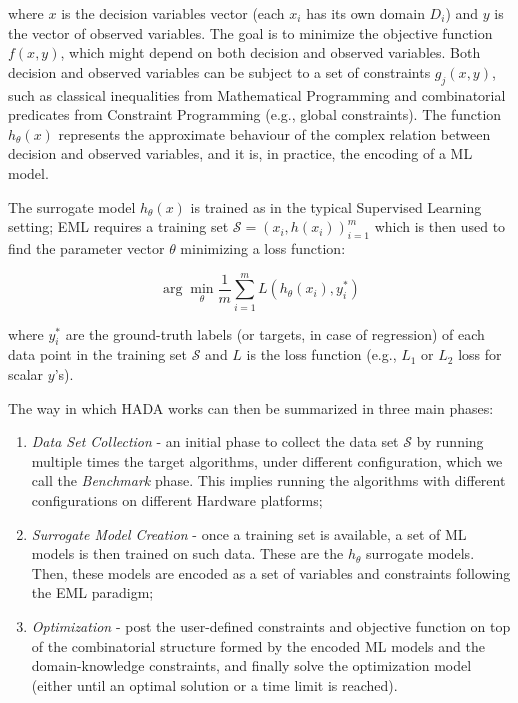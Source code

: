 \documentclass[a4paper,singleside,12pt]{report} %
\begin{document}
where $x$ is the decision variables vector (each $x_i$ has its own domain $D_i$) and $y$ is the vector of observed variables.
The goal is to minimize the objective function $f(x,y)$, which might depend on both decision and observed variables. Both 
decision and observed variables can be subject to a set of constraints $g_j(x,y)$, such as classical inequalities from 
Mathematical Programming and combinatorial predicates from Constraint Programming (e.g., global constraints). The function 
$h_{\theta}(x)$ represents the approximate behaviour of the complex relation between decision and observed variables, and it 
is, in practice, the encoding of a ML model.

The surrogate model $h_{\theta}(x)$ is trained as in the typical Supervised Learning setting; EML requires a training set 
$\mathcal{S} = (x_i, h(x_i))_{i=1}^{m}$ which is then used to find the parameter vector $\theta$ minimizing a loss function:

\begin{equation}
    \arg\min_{\theta} \frac{1}{m} \sum_{i=1}^{m} L(h_{\theta}(x_i), y_i^*)
\end{equation}

where $y_i^*$ are the ground-truth labels (or targets, in case of regression) of each data point in the training set 
$\mathcal{S}$ and $L$ is the loss function (e.g., $L_1$ or $L_2$ loss for scalar $y$'s).

The way in which HADA works can then be summarized in three main phases:
\begin{enumerate}
    \item \textit{Data Set Collection} - an initial phase to collect the data set $\mathcal{S}$ by running multiple times the target algorithms, 
    under different configuration, which we call the \textit{Benchmark} phase. This implies running the algorithms with different configurations on different Hardware platforms;
    \item \textit{Surrogate Model Creation} - once a training set is available, a set of ML models is then trained on such data. These are the $h_{\theta}$ surrogate models.
    Then, these models are encoded as a set of variables and constraints following the EML paradigm;
    \item \textit{Optimization} - post the user-defined constraints and objective function on top of the combinatorial structure
    formed by the encoded ML models and the domain-knowledge constraints, and finally solve the optimization model 
    (either until an optimal solution or a time limit is reached).
\end{enumerate}
\end{document}
